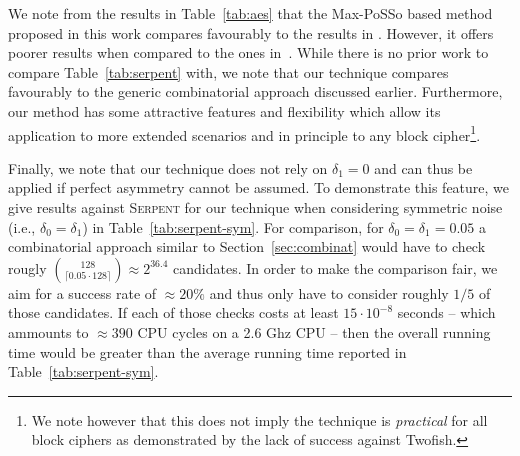 \documentclass{llncs}
\newcommand{\Serpent}{\textsc{Serpent}\xspace}
\begin{document}
We note from the results in Table~\ref{tab:aes} that the Max-PoSSo based method proposed in this work compares favourably to the results in \cite{coldboot}. However, it offers poorer results when compared to the ones in~\cite{tsow,aes-sat}. While there is no prior work to compare Table~\ref{tab:serpent} with, we note that our technique compares favourably to the generic combinatorial approach discussed earlier. Furthermore, our method has some attractive features and flexibility which allow its application to more extended scenarios and in principle to any block cipher\footnote{We note however that this does 
not imply the technique is \emph{practical} for all block ciphers as demonstrated by the lack of success against Twofish.}.

Finally, we note that our technique does not rely on $\delta_1 = 0 $ and can thus be applied if perfect asymmetry cannot be assumed.  To demonstrate this feature, we give results against \Serpent for our technique when considering symmetric noise (i.e., $\delta_0 = \delta_1$) in Table~\ref{tab:serpent-sym}. For comparison, for $\delta_0 = \delta_1 = 0.05$ a combinatorial approach similar to Section~\ref{sec:combinat} would have to check rougly ${128 \choose \lceil 0.05 \cdot 128\rceil} \approx 2^{36.4}$ candidates. In order to make the comparison fair, we aim for a success rate of $\approx 20\%$ and thus only have to consider roughly $1/5$ of those candidates. If each of those checks costs at least $15 \cdot 10^{-8}$ seconds -- which ammounts to $\approx 390$ CPU cycles on a 2.6 Ghz CPU -- then the overall running time would be greater than the average running time reported in Table~\ref{tab:serpent-sym}.
\end{document}
